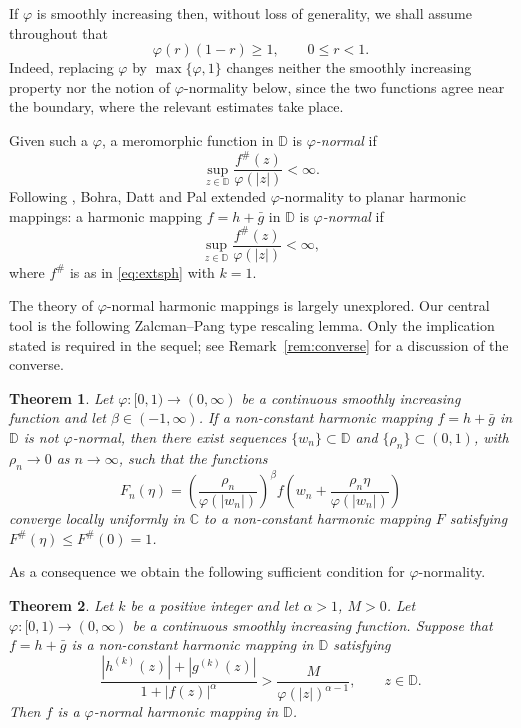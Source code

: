 \documentclass[11pt,reqno]{amsart}
\newtheorem{theorem}{Theorem}[section]
\theoremstyle{definition}
\newcommand{\D}{\mathbb{D}}
\newcommand{\C}{\mathbb{C}}
\begin{document}
If $\varphi$ is smoothly increasing then, without loss of generality, we shall assume
throughout that
\begin{equation}\label{eq:phinorm}
 \varphi(r)(1-r)\ge 1,\qquad 0\le r<1.
\end{equation}
Indeed, replacing $\varphi$ by $\max\{\varphi,1\}$ changes neither the smoothly increasing
property nor the notion of $\varphi$-normality below, since the two functions agree near
the boundary, where the relevant estimates take place.

Given such a $\varphi$, a meromorphic function in $\D$ is \emph{$\varphi$-normal} if
\[
\sup_{z\in\D}\frac{f^{\#}(z)}{\varphi(|z|)}<\infty.
\]
Following \cite{AR}, Bohra, Datt and Pal \cite{BDP} extended $\varphi$-normality to planar
harmonic mappings: a harmonic mapping $f=h+\bar g$ in $\D$ is \emph{$\varphi$-normal} if
\[
\sup_{z\in\D}\frac{f^{\#}(z)}{\varphi(|z|)}<\infty,
\]
where $f^{\#}$ is as in \eqref{eq:extsph} with $k=1$.

The theory of $\varphi$-normal harmonic mappings is largely unexplored. Our central tool is
the following Zalcman--Pang type rescaling lemma. Only the implication stated is required in
the sequel; see Remark~\ref{rem:converse} for a discussion of the converse.

\begin{theorem}\label{thm:rescale}
Let $\varphi\colon[0,1)\to(0,\infty)$ be a continuous smoothly increasing function and let
$\beta\in(-1,\infty)$. If a non-constant harmonic mapping $f=h+\bar g$ in $\D$ is
\emph{not} $\varphi$-normal, then there exist sequences $\{w_{n}\}\subset\D$ and
$\{\rho_{n}\}\subset(0,1)$, with $\rho_{n}\to0$ as $n\to\infty$, such that the functions
\[
F_{n}(\eta)=\left(\frac{\rho_{n}}{\varphi(|w_{n}|)}\right)^{\beta}
f\!\left(w_{n}+\frac{\rho_{n}\eta}{\varphi(|w_{n}|)}\right)
\]
converge locally uniformly in $\C$ to a non-constant harmonic mapping $F$ satisfying
$F^{\#}(\eta)\le F^{\#}(0)=1$.
\end{theorem}

As a consequence we obtain the following sufficient condition for $\varphi$-normality.

\begin{theorem}\label{thm:phisuff}
Let $k$ be a positive integer and let $\alpha>1$, $M>0$. Let
$\varphi\colon[0,1)\to(0,\infty)$ be a continuous smoothly increasing function. Suppose that
$f=h+\bar g$ is a non-constant harmonic mapping in $\D$ satisfying
\begin{equation}\label{eq:phisuff}
\frac{|h^{(k)}(z)|+|g^{(k)}(z)|}{1+|f(z)|^{\alpha}}>\frac{M}{\varphi(|z|)^{\alpha-1}},
\qquad z\in\D.
\end{equation}
Then $f$ is a $\varphi$-normal harmonic mapping in $\D$.
\end{theorem}
\end{document}

